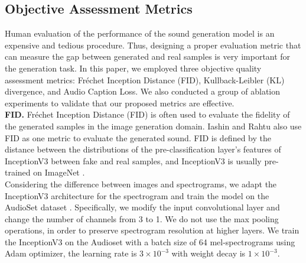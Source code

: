 \documentclass[lettersize,journal]{IEEEtran}
\begin{document}
\subsection{Objective Assessment Metrics}
Human evaluation of the performance of the sound generation model is an expensive and tedious procedure. Thus, designing a proper evaluation metric that can measure the gap between generated and real samples is very important for the generation task. In this paper, we employed three objective quality assessment metrics: Fréchet Inception Distance (FID), Kullback-Leibler (KL) divergence, and Audio Caption Loss. We also conducted a group of ablation experiments to validate that our proposed metrics are effective. \\
\textbf{FID.} Fréchet Inception Distance (FID) \cite{heusel2017gans} is often used to evaluate the fidelity of the generated samples in the image generation domain. Iashin and Rahtu \cite{iashin2021taming} also use FID as one metric to evaluate the generated sound. FID is defined by the distance between the distributions of the pre-classification layer’s features of InceptionV3 \cite{szegedy2016rethinking} between fake and real samples, and InceptionV3 is usually pre-trained on ImageNet \cite{deng2009imagenet}.
{}\\
Considering the difference between images and spectrograms, we adapt the InceptionV3 architecture \cite{szegedy2016rethinking} for the spectrogram and train the model on the AudioSet dataset \cite{gemmeke2017audio}. Specifically, we modify the input convolutional layer and change the number of channels from 3 to 1. We do not use the max pooling operations, in order to preserve {\color{black}spectrogram} resolution at higher layers. We train the InceptionV3 on the Audioset with a batch size of 64 mel-spectrograms using Adam optimizer, the learning rate is $3 \times 10^{-3}$ with weight decay is $1 \times 10^{-3}$.\\
\end{document}
